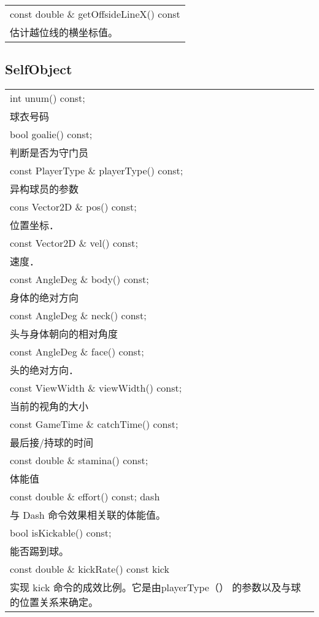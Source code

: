 
\begin{tabular}{p{}}
	\hline	
		const double \& getOffsideLineX() const\\
		估计越位线的横坐标值。\\
	\hline	
\end{tabular}	

\subsection{SelfObject}
\begin{tabular}{p{}}
	\hline
		int unum() const; \\
		球衣号码\\
	\hline
		bool goalie() const; \\
		判断是否为守门员\\
	\hline
		const PlayerType \& playerType() const; \\
		异构球员的参数\\
	\hline
		cons Vector2D \& pos() const; \\
		位置坐标．\\
	\hline
		const Vector2D \& vel() const; \\
		速度．\\
	\hline
		const AngleDeg \& body() const; \\
		身体的绝对方向\\
	\hline
		const AngleDeg \& neck() const; \\
		头与身体朝向的相对角度\\
	\hline
		const AngleDeg \& face() const; \\
		头的绝对方向．\\
	\hline
		const ViewWidth \& viewWidth() const; \\
		当前的视角的大小\\
	\hline
		const GameTime \& catchTime() const; \\
		最后接/持球的时间\\
	\hline
		const double \& stamina() const; \\
		体能值\\
	\hline
		const double \& effort() const; dash \\
		与 Dash 命令效果相关联的体能值。\\
	\hline
		bool isKickable() const;\\
		能否踢到球。\\
	\hline
		const double \& kickRate() const kick \\
		实现 kick 命令的成效比例。它是由playerType（） 的参数以及与球的位置关系来确定。\\
	\hline 


\end{tabular}


